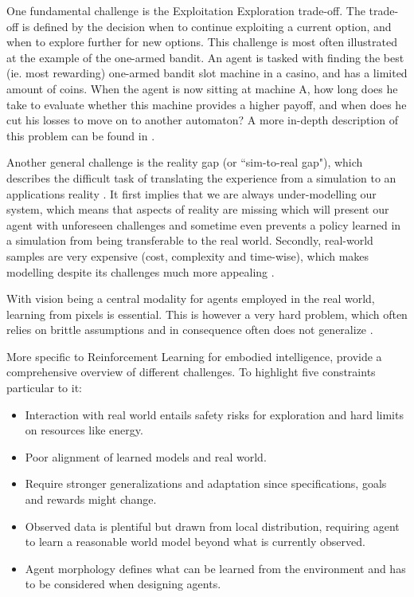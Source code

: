 \documentclass[twoside,11pt]{article}
\begin{document}
One fundamental challenge is the Exploitation Exploration trade-off. The trade-off is defined by the decision when to continue exploiting a current option, and when to explore further for new options. This challenge is most often illustrated at the example of the one-armed bandit. An agent is tasked with finding the best (ie. most rewarding) one-armed bandit slot machine in a casino, and has a limited amount of coins. When the agent is now sitting at machine A, how long does he take to evaluate whether this machine provides a higher payoff, and when does he cut his losses to move on to another automaton? A more in-depth description of this problem can be found in \citet{AudibertMunosSzepesv:2009:ExplorationExploitation}.

Another general challenge is the reality gap (or ``sim-to-real gap"), which describes the difficult task of translating the experience from a simulation to an applications reality \citep{ZagalJavierVallejos:2004:RealityGap}. It first implies that we are always under-modelling our system, which means that aspects of reality are missing which will present our agent with unforeseen challenges and sometime even prevents a policy learned in a simulation from being transferable to the real world. Secondly, real-world samples are very expensive (cost, complexity and time-wise), which makes modelling despite its challenges much more appealing  \cite{KoberBagnellPeters:2013:RLRoboticsSurvey}.

With vision being a central modality for agents employed in the real world, learning from pixels is essential. This is however a very hard problem, which often relies on brittle assumptions and in consequence often does not generalize \citet{TomarEtAl:2021:LearnPixelControlRepresentations}.


More specific to Reinforcement Learning for embodied intelligence, \cite{RoyEtAl:2021:RLRoboticsChallenges} provide a comprehensive overview of different challenges. To highlight five constraints particular to it:
\begin{itemize}
    \item Interaction with real world entails safety risks for exploration and hard limits on resources like energy.
    \item Poor alignment of learned models and real world.
    \item Require stronger generalizations  and adaptation since specifications, goals and rewards might change.
    \item Observed data is plentiful but drawn from local distribution, requiring agent to learn a reasonable world model beyond  what is currently observed. 
    \item Agent morphology defines what can be learned from the environment and has to be considered when designing agents.
\end{itemize}
\end{document}

